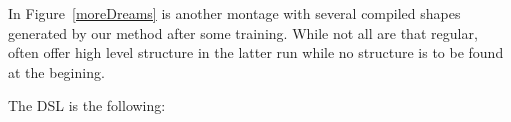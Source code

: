 \documentclass{article}
\begin{document}
In Figure~\ref{moreDreams} is another montage with several compiled shapes generated by our
method after some training. While not all are that regular, often offer high
level structure in the latter run while no structure is to be found at the
begining.




The DSL is the following:
\end{document}
